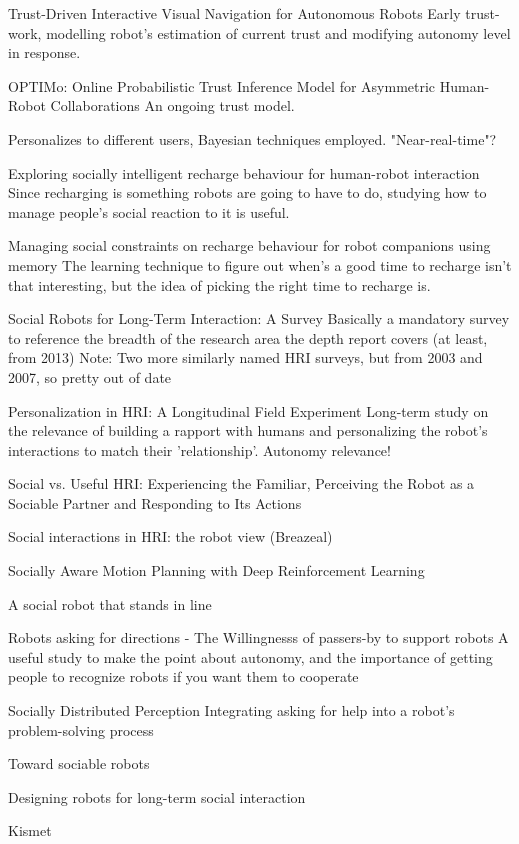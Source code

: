 \documentclass{sfuthesis}
\begin{document}
Trust-Driven Interactive Visual Navigation for Autonomous Robots	Early trust-work, modelling robot's estimation of current trust and modifying autonomy level in response.

OPTIMo: Online Probabilistic Trust Inference Model for Asymmetric Human-Robot Collaborations	An ongoing trust model. 

Personalizes to different users, Bayesian techniques employed. "Near-real-time"?

Exploring socially intelligent recharge behaviour for human-robot interaction	Since recharging is something robots are going to have to do, studying how to manage people's social reaction to it is useful.

Managing social constraints on recharge behaviour for robot companions using memory	The learning technique to figure out when's a good time to recharge isn't that interesting, but the idea of picking the right time to recharge is.


Social Robots for Long-Term Interaction: A Survey Basically a mandatory survey to reference the breadth of the research area the depth report covers (at least, from 2013) Note: Two more similarly named HRI surveys, but from 2003 and 2007, so pretty out of date

Personalization in HRI: A Longitudinal Field Experiment	Long-term study on the relevance of building a rapport with humans and personalizing the robot's interactions to match their 'relationship'. Autonomy relevance!

Social vs. Useful HRI: Experiencing the Familiar, Perceiving the Robot as a Sociable Partner and Responding to Its Actions

Social interactions in HRI: the robot view (Breazeal)

Socially Aware Motion Planning with Deep Reinforcement Learning 

A social robot that stands in line

Robots asking for directions - The Willingnesss of passers-by to support robots	A useful study to make the point about autonomy, and the importance of getting people to recognize robots if you want them to cooperate

Socially Distributed Perception	Integrating asking for help into a robot's problem-solving process

Toward sociable robots

Designing robots for long-term social interaction

Kismet
\end{document}
